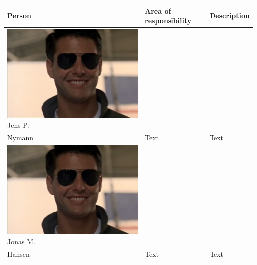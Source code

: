 \begin{tabular}[c]{|p{3cm}| p{5cm} | p{6cm}|}
	\hline
	\textbf{Person} & \textbf{Area of responsibility} & \textbf{Description}\\\hline
	
	\phantom{Test}
	\includegraphics[scale=0.54]{Introduction/TeamPictures/TomC} \newline
	Jens P.\\Nymann
	& Text & Text\\\hline
	
	\phantom{Test}
	\includegraphics[scale=0.54]{Introduction/TeamPictures/TomC} \newline
	Jonas M.\\Hansen
	& Text & Text\\\hline
	

\end{tabular}
